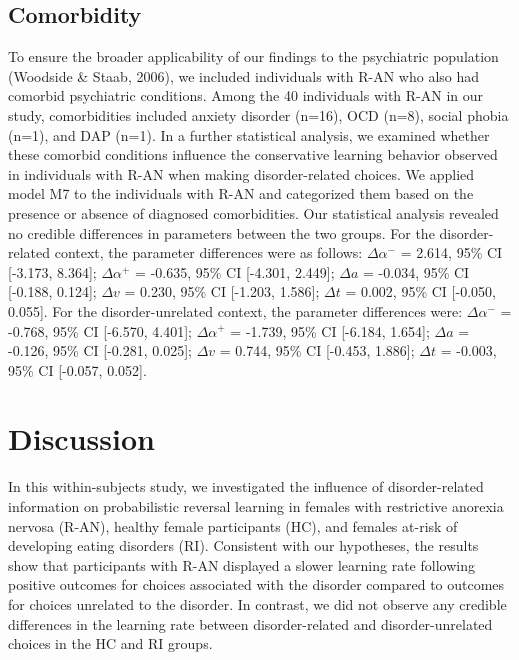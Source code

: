 \documentclass[
  man,floatsintext]{apa6}
\begin{document}
\hypertarget{comorbidity}{%
\subsection{Comorbidity}\label{comorbidity}}

To ensure the broader applicability of our findings to the psychiatric population (Woodside \& Staab, 2006), we included individuals with R-AN who also had comorbid psychiatric conditions. Among the 40 individuals with R-AN in our study, comorbidities included anxiety disorder (n=16), OCD (n=8), social phobia (n=1), and DAP (n=1). In a further statistical analysis, we examined whether these comorbid conditions influence the conservative learning behavior observed in individuals with R-AN when making disorder-related choices. We applied model M7 to the individuals with R-AN and categorized them based on the presence or absence of diagnosed comorbidities. Our statistical analysis revealed no credible differences in parameters between the two groups. For the disorder-related context, the parameter differences were as follows: \(\Delta \alpha^-\) = 2.614, 95\% CI {[}-3.173, 8.364{]}; \(\Delta \alpha^+\) = -0.635, 95\% CI {[}-4.301, 2.449{]}; \(\Delta a\) = -0.034, 95\% CI {[}-0.188, 0.124{]}; \(\Delta v\) = 0.230, 95\% CI {[}-1.203, 1.586{]}; \(\Delta t\) = 0.002, 95\% CI {[}-0.050, 0.055{]}. For the disorder-unrelated context, the parameter differences were: \(\Delta \alpha^-\) = -0.768, 95\% CI {[}-6.570, 4.401{]}; \(\Delta \alpha^+\) = -1.739, 95\% CI {[}-6.184, 1.654{]}; \(\Delta a\) = -0.126, 95\% CI {[}-0.281, 0.025{]}; \(\Delta v\) = 0.744, 95\% CI {[}-0.453, 1.886{]}; \(\Delta t\) = -0.003, 95\% CI {[}-0.057, 0.052{]}.

\hypertarget{discussion}{%
\section{Discussion}\label{discussion}}

In this within-subjects study, we investigated the influence of disorder-related information on probabilistic reversal learning in females with restrictive anorexia nervosa (R-AN), healthy female participants (HC), and females at-risk of developing eating disorders (RI). Consistent with our hypotheses, the results show that participants with R-AN displayed a slower learning rate following positive outcomes for choices associated with the disorder compared to outcomes for choices unrelated to the disorder. In contrast, we did not observe any credible differences in the learning rate between disorder-related and disorder-unrelated choices in the HC and RI groups.
\end{document}

